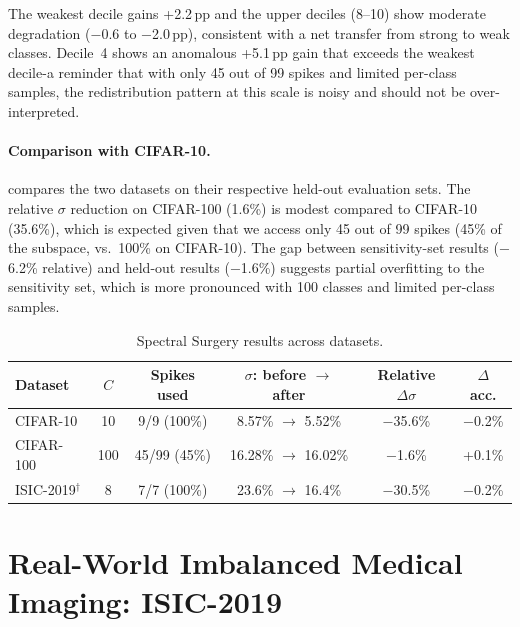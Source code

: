\documentclass[11pt,a4paper]{article}
\begin{document}
The weakest decile gains +2.2\,pp and the upper deciles (8--10)
show moderate degradation ($-$0.6 to $-$2.0\,pp), consistent
with a net transfer from strong to weak classes. Decile~4 shows
an anomalous +5.1\,pp gain that exceeds the weakest decile-a
reminder that with only 45 out of 99 spikes and limited per-class
samples, the redistribution pattern at this scale is noisy and should
not be over-interpreted.

\paragraph{Comparison with CIFAR-10.}
 compares the two datasets on their
respective held-out evaluation sets. The relative $\sigma$ reduction on
CIFAR-100 (1.6\%) is modest compared to CIFAR-10 (35.6\%), which is
expected given that we access only 45 out of 99 spikes (45\% of the
subspace, vs.\ 100\% on CIFAR-10). The gap between sensitivity-set
results ($-$6.2\% relative) and held-out results ($-$1.6\%) suggests
partial overfitting to the sensitivity set, which is more pronounced
with 100 classes and limited per-class samples.

\begin{table}[ht]
\centering
\caption{Spectral Surgery results across datasets.}
\label{tab:cifar-comparison}
\begin{tabular}{lccccc}
\toprule
Dataset & $C$ & Spikes used & $\sigma$: before $\to$ after
  & Relative $\Delta\sigma$ & $\Delta$ acc. \\
\midrule
CIFAR-10 & 10 & 9/9 (100\%)
  & 8.57\% $\to$ 5.52\% & $-$35.6\% & $-$0.2\% \\
CIFAR-100 & 100 & 45/99 (45\%)
  & 16.28\% $\to$ 16.02\% & $-$1.6\% & +0.1\% \\
ISIC-2019$^\dagger$ & 8 & 7/7 (100\%)
  & 23.6\% $\to$ 16.4\% & $-$30.5\% & $-$0.2\% \\
\bottomrule
\end{tabular}
\smallskip\par{}
\end{table}

\newpage

\section{Real-World Imbalanced Medical Imaging: ISIC-2019}
\label{sec:isic}
\end{document}
